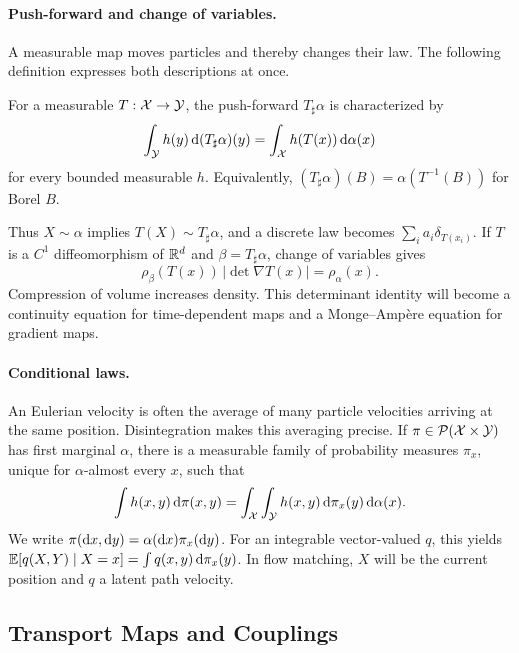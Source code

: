 \paragraph{Push-forward and change of variables.}
A measurable map moves particles and thereby changes their law. The following definition expresses both descriptions at once.
\begin{defn}\label{defn-pushfwd}
For a measurable $T:\mathcal{X}\to\mathcal{Y}$, the push-forward $T_\sharp\alpha$ is characterized by
\begin{equation}\label{eq-equiv-pushfwd}
  \int_{\mathcal{Y}} h(y)\,\mathrm{d}(T_\sharp\alpha)(y)
  =\int_{\mathcal{X}} h(T(x))\,\mathrm{d}\alpha(x)
\end{equation}
for every bounded measurable $h$. Equivalently, $(T_\sharp\alpha)(B)=\alpha(T^{-1}(B))$ for Borel $B$.
\end{defn}
Thus $X\sim\alpha$ implies $T(X)\sim T_\sharp\alpha$, and a discrete law becomes $\sum_i a_i\delta_{T(x_i)}$. If $T$ is a $C^1$ diffeomorphism of $\mathbb{R}^d$ and $\beta=T_\sharp\alpha$, change of variables gives
\begin{equation}\label{eq-pfwd-density}
  \rho_\beta(T(x))\,|\det\nabla T(x)|=\rho_\alpha(x).
\end{equation}
Compression of volume increases density. This determinant identity will become a continuity equation for time-dependent maps and a Monge--Amp\`ere equation for gradient maps.

\paragraph{Conditional laws.}
An Eulerian velocity is often the average of many particle velocities arriving at the same position. Disintegration makes this averaging precise. If $\pi\in\mathcal{P}(\mathcal{X}\times\mathcal{Y})$ has first marginal $\alpha$, there is a measurable family of probability measures $\pi_x$, unique for $\alpha$-almost every $x$, such that
\begin{equation}\label{eq-primer-disintegration}
  \int h(x,y)\,\mathrm{d}\pi(x,y)
  =\int_{\mathcal{X}}\int_{\mathcal{Y}} h(x,y)\,\mathrm{d}\pi_x(y)\,\mathrm{d}\alpha(x).
\end{equation}
We write $\pi(\mathrm{d} x,\mathrm{d} y)=\alpha(\mathrm{d} x)\pi_x(\mathrm{d} y)$. For an integrable vector-valued $q$, this yields $\mathbb{E}[q(X,Y)\mid X=x]=\int q(x,y)\,\mathrm{d}\pi_x(y)$. In flow matching, $X$ will be the current position and $q$ a latent path velocity.

\subsection{Transport Maps and Couplings}
\label{sec-monge-formulation}
\label{sec-continuous-monge}
\label{sec-kantorovich}
\label{sec-kantorovich-continuous}

